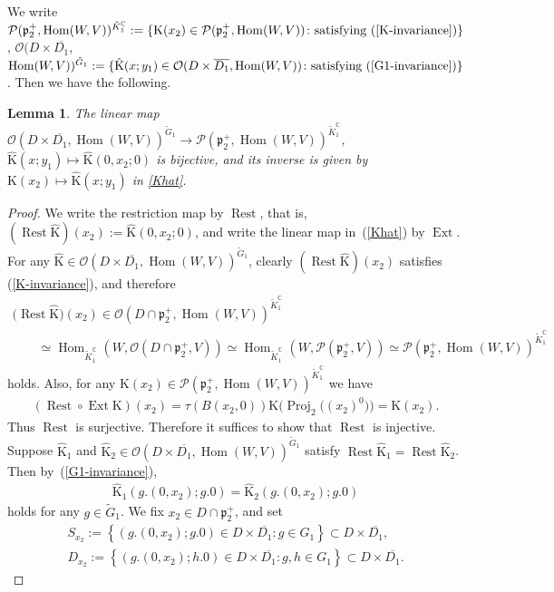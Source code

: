 \documentclass[pdftex]{sigma}
\numberwithin{equation}{section}
\newtheorem{Lemma}[Theorem]{Lemma}
\newcommand{\BC}{\mathbb{C}}
\newcommand{\fp}{\mathfrak{p}}
\newcommand{\cO}{\mathcal{O}}
\newcommand{\cP}{\mathcal{P}}
\newcommand{\rK}{\mathrm{K}}
\newcommand{\Hom}{\operatorname{Hom}}
\newcommand{\Ext}{\operatorname{Ext}}
\newcommand{\Proj}{\operatorname{Proj}}
\newcommand{\Rest}{\operatorname{Rest}}
\begin{document}
We write $\cP(\fp^+_2,\Hom(W,V))^{\tilde{K}^\BC_1}:=\{\rK(x_2)\in \cP(\fp^+_2,\Hom(W,V))\colon \text{satisfying }(\ref{K-invariance})\}$,
$\cO(D\times \overline{D_1}$, $\Hom(W,V))^{\tilde{G}_1}
:=\{\hat{\rK}(x;y_1)\in\cO(D\times \overline{D_1}, \Hom(W,V))\colon \text{satisfying }(\ref{G1-invariance})\}$.
Then we have the following.
\begin{Lemma}
The linear map $\cO(D\times \overline{D_1}, \Hom(W,V))^{\tilde{G}_1}\to\cP(\fp^+_2,\Hom(W,V))^{\tilde{K}^\BC_1}$,
$\hat{\rK}(x;y_1)\mapsto \hat{\rK}(0,x_2;0)$ is bijective, and its inverse is given by $\rK(x_2)\mapsto \hat{\rK}(x;y_1)$ in \eqref{Khat}.
\end{Lemma}
\begin{proof}We write the restriction map by $\Rest$, that is, $(\Rest \hat{\rK})(x_2):=\hat{\rK}(0,x_2;0)$,
and write the linear map in~(\ref{Khat}) by $\Ext$.
For any $\hat{\rK}\in\cO(D\times \overline{D_1}, \Hom(W,V))^{\tilde{G}_1}$, clearly $(\Rest \hat{\rK})(x_2)$ satisfies
(\ref{K-invariance}), and therefore
\begin{gather*}
\big(\Rest \hat{\rK}\big)(x_2)\in \cO(D\cap \fp^+_2,\Hom(W,V))^{\tilde{K}^\BC_1}\\
\qquad {} \simeq \Hom_{\tilde{K}^\BC_1}(W,\cO(D\cap\fp^+_2,V)) \simeq\Hom_{\tilde{K}^\BC_1}(W,\cP(\fp^+_2,V))\simeq\cP(\fp^+_2,\Hom(W,V))^{\tilde{K}^\BC_1}
\end{gather*}
holds.
Also, for any $\rK(x_2)\in\cP(\fp^+_2,\allowbreak\Hom(W,V))^{\tilde{K}^\BC_1}$ we have
\begin{gather*} (\Rest\circ\Ext \rK)(x_2)=\tau(B(x_2,0))\rK\big(\Proj_2\big((x_2)^0\big)\big)=\rK(x_2). \end{gather*}
Thus $\Rest$ is surjective. Therefore it suffices to show that $\Rest$ is injective.
Suppose $\hat{\rK}_1$ and $\hat{\rK}_2\in\cO(D\times \overline{D_1}, \Hom(W,V))^{\tilde{G}_1}$ satisfy $\Rest\hat{\rK}_1=\Rest\hat{\rK}_2$.
Then by~(\ref{G1-invariance}),
\begin{gather*} \hat{\rK}_1(g.(0,x_2);g.0)=\hat{\rK}_2(g.(0,x_2);g.0) \end{gather*}
holds for any $g\in\tilde{G}_1$.
We fix $x_2\in D\cap \fp^+_2$, and set
\begin{gather*}
S_{x_2} :=\left\{ (g.(0,x_2);g.0)\in D\times\overline{D_1}\colon g\in G_1\right\}\subset D\times\overline{D_1}, \\
D_{x_2} :=\left\{ (g.(0,x_2);h.0)\in D\times\overline{D_1}\colon g,h\in G_1\right\}\subset D\times\overline{D_1}.
\end{gather*}

\end{proof}
\end{document}
